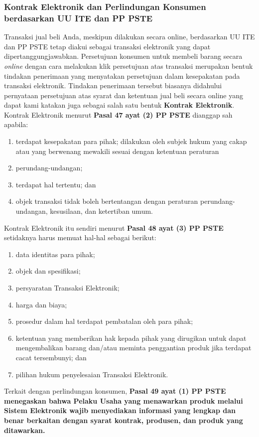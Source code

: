 \subsubsection{Kontrak Elektronik dan Perlindungan Konsumen berdasarkan UU ITE dan PP PSTE}
Transaksi jual beli Anda, meskipun dilakukan secara online, berdasarkan UU ITE dan PP PSTE tetap diakui sebagai transaksi elektronik yang dapat dipertanggungjawabkan. Persetujuan konsumen untuk membeli barang secara \textit{online} dengan cara melakukan klik persetujuan atas transaksi merupakan bentuk tindakan penerimaan yang menyatakan persetujuan dalam kesepakatan pada transaksi elektronik. Tindakan penerimaan tersebut biasanya didahului pernyataan persetujuan atas syarat dan ketentuan jual beli secara online yang dapat kami katakan juga sebagai salah satu bentuk \textbf{Kontrak Elektronik}. Kontrak Elektronik menurut \textbf{Pasal 47 ayat (2) PP PSTE} dianggap sah apabila:
\begin{enumerate}[label=\alph*.]
	\item terdapat kesepakatan para pihak;
	dilakukan oleh subjek hukum yang cakap atau yang berwenang mewakili sesuai dengan ketentuan peraturan \item perundang-undangan;
	\item terdapat hal tertentu; dan
	\item objek transaksi tidak boleh bertentangan dengan peraturan perundang-undangan, kesusilaan, dan ketertiban umum.
\end{enumerate}
\indent Kontrak Elektronik itu sendiri menurut \textbf{Pasal 48 ayat (3) PP PSTE} setidaknya harus memuat hal-hal sebagai berikut:
\begin{enumerate}[label=\alph*.]
	\item data identitas para pihak;
	\item objek dan spesifikasi;
	\item persyaratan Transaksi Elektronik;
	\item harga dan biaya;
	\item prosedur dalam hal terdapat pembatalan oleh para pihak;
	\item ketentuan yang memberikan hak kepada pihak yang dirugikan untuk dapat mengembalikan barang dan/atau meminta penggantian produk jika terdapat cacat tersembunyi; dan
	\item pilihan hukum penyelesaian Transaksi Elektronik.
\end{enumerate}
\indent Terkait dengan perlindungan konsumen, \textbf{Pasal 49 ayat (1) PP PSTE menegaskan bahwa Pelaku Usaha yang menawarkan produk melalui Sistem Elektronik wajib menyediakan informasi yang lengkap dan benar berkaitan dengan syarat kontrak, produsen, dan produk yang ditawarkan.}

